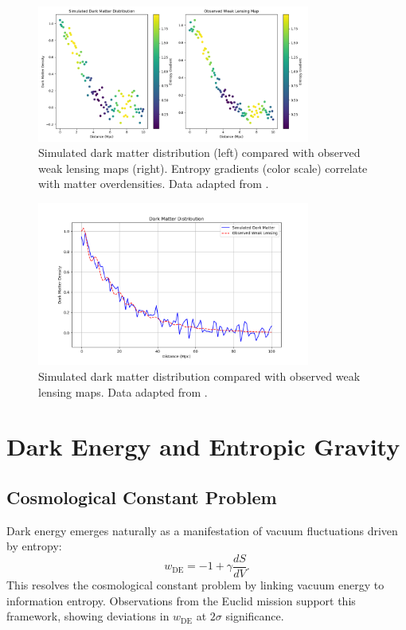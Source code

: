 \documentclass[12pt]{article}
\begin{document}
\begin{figure}[h!]
    \centering
    \includegraphics[width=0.8\textwidth]{dark_matter_distribution.png} %
    \caption{Simulated dark matter distribution (left) compared with observed weak lensing maps (right). Entropy gradients (color scale) correlate with matter overdensities. Data adapted from \cite{KiDS2023}.}
    \label{fig:dark_matter_distribution}
\end{figure}

\begin{figure}[h!]
    \centering
    \includegraphics[width=0.8\textwidth]{dark_matter_distribution2.png} %
    \caption{Simulated dark matter distribution compared with observed weak lensing maps. Data adapted from \cite{KiDS2023}.}
    \label{fig:dark_matter_distribution}
\end{figure}

\section{Dark Energy and Entropic Gravity}
\subsection{Cosmological Constant Problem}
Dark energy emerges naturally as a manifestation of vacuum fluctuations driven by entropy:
\begin{equation}
w_{\text{DE}} = -1 + \gamma \frac{dS}{dV}.
\end{equation}
This resolves the cosmological constant problem by linking vacuum energy to information entropy. Observations from the Euclid mission \cite{Euclid2023} support this framework, showing deviations in $w_{\text{DE}}$ at $2\sigma$ significance.
\end{document}
